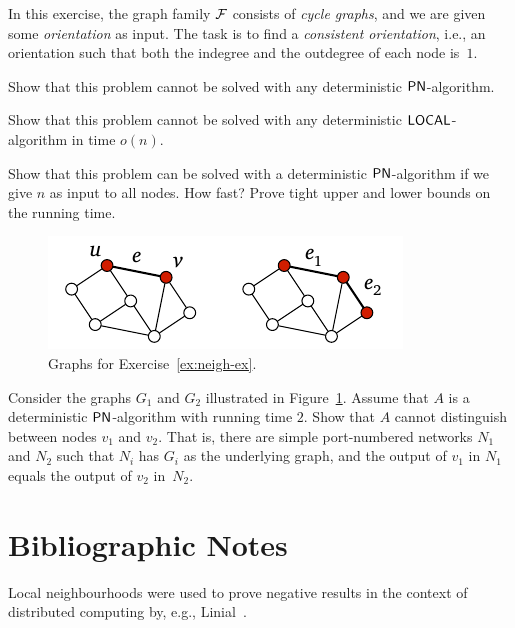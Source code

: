 \begin{exs}[orientations]
    In this exercise, the graph family $\mathcal{F}$ consists of \emph{cycle graphs}, and we are given some \emph{orientation} as input. The task is to find a \emph{consistent orientation}, i.e., an orientation such that both the indegree and the outdegree of each node is~$1$.
    \begin{subex}
        \item Show that this problem cannot be solved with any deterministic $\textup{\sffamily PN}$-algorithm.
        \item Show that this problem cannot be solved with any deterministic $\textup{\sffamily LOCAL}$-algorithm in time $o(n)$.
        \item Show that this problem can be solved with a deterministic $\textup{\sffamily PN}$-algorithm if we give $n$ as input to all nodes. How fast? Prove tight upper and lower bounds on the running time.
    \end{subex}
\end{exs}

\begin{figure}
    \centering
    \includegraphics[page=\PNeighEx]{figs.pdf}
    \caption{Graphs for Exercise~\ref{ex:neigh-ex}.}\label{fig:neigh-ex}
\end{figure}

\begin{exs}\label{ex:neigh-ex}
    Consider the graphs $G_1$ and $G_2$ illustrated in Figure~\ref{fig:neigh-ex}. Assume that $A$ is a deterministic $\textup{\sffamily PN}$-algorithm with running time $2$. Show that $A$ cannot distinguish between nodes $v_1$ and $v_2$. That is, there are simple port-numbered networks $N_1$ and $N_2$ such that $N_i$ has $G_i$ as the underlying graph, and the output of $v_1$ in $N_1$ equals the output of $v_2$ in~$N_2$.

\end{exs}


\section{Bibliographic Notes}

Local neighbourhoods were used to prove negative results in the context of distributed computing by, e.g., Linial~\cite{linial92locality}.
